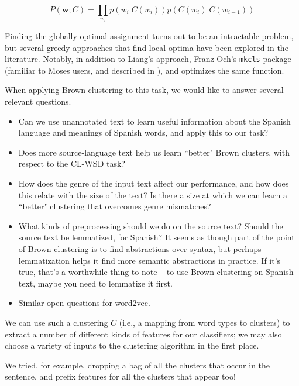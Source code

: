 \begin{equation} \label{eq:brownclassprob}
P(\boldsymbol{w}; C) = \prod_{w_i} p(w_i | C(w_i)) p(C(w_i) | C(w_{i-1}))
\end{equation}

Finding the globally optimal assignment turns out to be an intractable problem,
but several greedy approaches that find local optima have been explored in the
literature.  Notably, in addition to Liang's approach, Franz Och's
\texttt{mkcls} package (familiar to Moses users, and described in
\cite{och1999efficient}), and optimizes the same function.

When applying Brown clustering to this task, we would like to answer several
relevant questions.

\begin{itemize}
  \item Can we use unannotated text to learn useful information about the
  Spanish language and meanings of Spanish words, and apply this to our task?
  \item Does more source-language text help us learn ``better" Brown clusters,
    with respect to the CL-WSD task?
  \item How does the genre of the input text affect our performance, and how
  does this relate with the size of the text? Is there a size at which we
    can learn a ``better" clustering that overcomes genre mismatches?
  \item What kinds of preprocessing should we do on the source text? Should the
  source text be lemmatized, for Spanish? It seems as though part of the point
  of Brown clustering is to find abstractions over syntax, but perhaps
  lemmatization helps it find more semantic abstractions in practice.
  If it's true, that's a worthwhile thing to note -- to use Brown clustering on
  Spanish text, maybe you need to lemmatize it first.
  \item Similar open questions for word2vec.
\end{itemize}

We can use such a clustering $C$ (i.e., a mapping from word types to clusters)
to extract a number of different kinds of features for our classifiers; we may
also choose a variety of inputs to the clustering algorithm in the first place.


We tried, for example, dropping a bag of all the clusters that occur in the
sentence, and prefix features for all the clusters that appear too!

